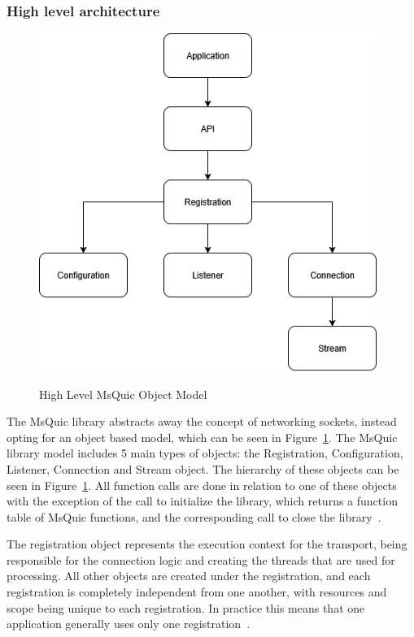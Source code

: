 \documentclass[english, 12pt, a4paper, elec, utf8, a-2b, online]{aaltothesis}
\begin{document}
\subsubsection{High level architecture}

\begin{figure}[h]
	\centering
	\includegraphics[alt={Block diagram of the high level object model of the MsQuic library, including relationships}, height=11cm]{./images/msquic_architecture.png}
	\caption{High Level MsQuic Object Model}
	\label{fig:msquic_arch}
\end{figure}

The MsQuic library abstracts away the concept of networking sockets, instead opting
for an object based model, which can be seen in Figure~\ref{fig:msquic_arch}. The
MsQuic library model includes 5 main types of objects: the Registration, Configuration,
Listener, Connection and Stream object. The hierarchy of these objects can be seen
in Figure~\ref{fig:msquic_arch}. All function calls are done in relation to one of
these objects with the exception of the call to initialize the library, which returns
a function table of MsQuic functions, and the corresponding call to close the library~\cite{msquic_docs}.

The registration object represents the execution context for the transport, being
responsible for the connection logic and creating the threads that are used for
processing. All other objects are created under the registration, and each registration
is completely independent from one another, with resources and scope being
unique to each registration. In practice this means that one application generally
uses only one registration~\cite{msquic_docs}.
\end{document}

